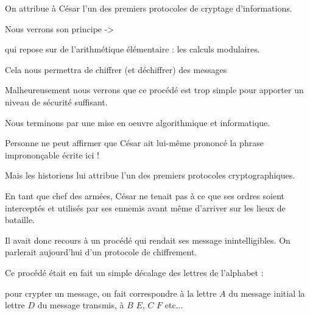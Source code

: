 







\debuttexte

\diapo

\change

On attribue à César l'un des premiers protocoles de cryptage d'informations.

\change

Nous verrons son principe ->

\change

qui repose sur de l'arithmétique élémentaire : les calculs modulaires.

\change

Cela nous permettra de chiffrer (et déchiffrer) des messages

\change

Malheureusement nous verrons que ce procédé est trop simple pour apporter un niveau de sécurité suffisant.

\change 

Nous terminons par une mise en oeuvre algorithmique et informatique.


\diapo

Personne ne peut affirmer que César ait lui-même prononcé la phrase imprononçable écrite ici !

\change

Mais les historiens lui attribue l'un des premiers protocoles cryptographiques.

En tant que chef des armées, César ne tenait pas à ce que ses ordres soient interceptés et utilisés par ses ennemis avant même d'arriver sur les lieux de bataille.

Il avait donc recours à un procédé qui rendait ses message inintelligibles. On parlerait aujourd'hui d'un protocole de chiffrement.

\change

Ce procédé était en fait un simple décalage des lettres de l'alphabet : 

\change

pour crypter un message, on fait correspondre à la lettre $A$ du message initial la lettre $D$ du message transmis, à $B$  $E$, $C$  $F$ etc...


